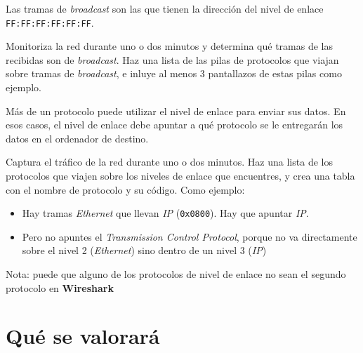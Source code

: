 \begin{homeworkProblem}

  Las tramas de \textit{broadcast} son las que tienen la dirección del nivel de enlace \texttt{FF:FF:FF:FF:FF:FF}.

  Monitoriza la red durante uno o dos minutos y determina qué tramas de las recibidas son de \textit{broadcast}. Haz una lista de las pilas de protocolos que viajan sobre tramas de \textit{broadcast}, e inluye al menos 3 pantallazos de estas pilas como ejemplo.

\end{homeworkProblem}


\begin{homeworkProblem}
  Más de un protocolo puede utilizar el nivel de enlace para enviar sus datos. En esos casos, el nivel de enlace debe apuntar a qué protocolo se le entregarán los datos en el ordenador de destino.
  
  Captura el tráfico de la red durante uno o dos minutos. Haz una lista de los protocolos que viajen sobre los niveles de enlace que encuentres, y crea una tabla con el nombre de protocolo y su código. Como ejemplo:
  \begin{itemize}
  \item Hay tramas \textit{Ethernet} que llevan \textit{IP} (\texttt{0x0800}). Hay que apuntar \textit{IP}.
  \item Pero no apuntes el \textit{Transmission Control  Protocol}, porque no va directamente sobre el nivel 2 (\textit{Ethernet}) sino dentro de un nivel 3 (\textit{IP})
\end{itemize}
  \small{Nota: puede que alguno de los protocolos de nivel de enlace no sean el segundo protocolo en \textbf{Wireshark}}
\end{homeworkProblem}




\clearpage
\section{Qué se valorará}

